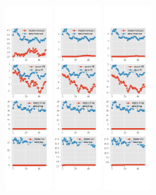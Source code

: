 \documentclass[]{article}
\begin{document}
\begin{figure}[htbp]
\begin{subfigure}[b]{\textwidth}
		\includegraphics[width=0.19\textwidth]{figures/sce_se_est_diag2.png}
		\includegraphics[width=0.19\textwidth]{figures/sce_se_est_diag3.png}
		\includegraphics[width=0.19\textwidth]{figures/sce_se_est_diag4.png}

\end{subfigure}
\end{figure}
\end{document}
